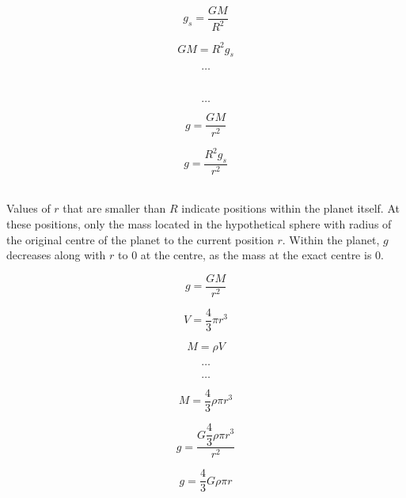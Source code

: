 \documentclass[10pt]{article}
\begin{document}
\begin{figure}[H]
\centering
\begin{minipage}{.8\textwidth}
\begin{tcolorbox}[
sharp corners=all,
colback=white,
colframe=white,
size=tight,
boxrule=0.2mm,
left=10mm, right=10mm
]
\begin{multicols}{2}
\noindent
\\
\[g_s = \dfrac{GM}{R^2}\]

\[GM = R^2g_s \]

\[\textbf{\ldots}\]
\\
\columnbreak
\\
\[\textbf{\ldots}\]

\[g = \dfrac{GM}{r^2}\]

\[g = \dfrac{R^2g_s}{r^2}\]
\\

\end{multicols}
\end{tcolorbox}
\end{minipage}
\end{figure}

Values of \(r\) that are smaller than \(R\) indicate positions within the planet itself. At these positions, only the mass located in the hypothetical sphere with radius of the original centre of the planet to the current position \(r\). Within the planet, \(g\) decreases along with \(r\) to 0 at the centre, as the mass at the exact centre is 0.

\begin{figure}[H]
\centering
\begin{minipage}{.8\textwidth}
\begin{tcolorbox}[
sharp corners=all,
colback=white,
colframe=white,
size=tight,
boxrule=0.2mm,
left=10mm, right=10mm
]
\begin{multicols}{2}
\noindent

\[g = \dfrac{GM}{r^2}\]

\[V = \dfrac{4}{3} \pi r^3\]

\[M = \rho V\]

\[\textbf{\ldots}\]
\columnbreak

\[\textbf{\ldots}\]

\[M = \dfrac{4}{3} \rho \pi r^3\]

\[g = \dfrac{G \dfrac{4}{3} \rho \pi r^3}{r^2}\]

\[g = \dfrac{4}{3} G \rho \pi r\]
\end{multicols}
\end{tcolorbox}
\end{minipage}
\end{figure}
\end{document}
